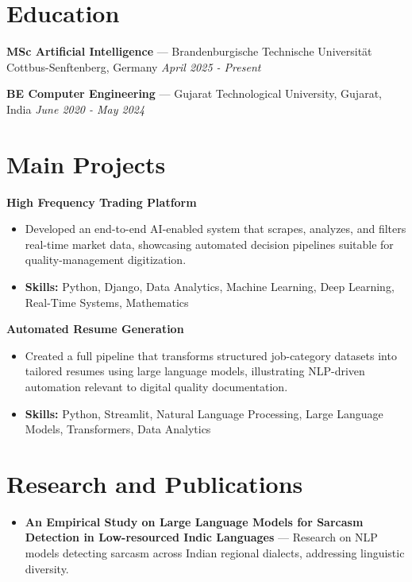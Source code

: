 \documentclass[a4paper,10pt]{article}
\begin{document}
\section*{Education}
\textbf{MSc Artificial Intelligence} — Brandenburgische Technische Universität Cottbus-Senftenberg, Germany \hfill \textit{April 2025 - Present}\par
\vspace{1.5pt}
\textbf{BE Computer Engineering} — Gujarat Technological University, Gujarat, India \hfill \textit{June 2020 - May 2024}\par

\section*{Main Projects}
\textbf{High Frequency Trading Platform}\par
\vspace{1pt}
\begin{itemize}
  \item Developed an end-to-end AI-enabled system that scrapes, analyzes, and filters real-time market data, showcasing automated decision pipelines suitable for quality-management digitization.
  \item \textbf{Skills:} Python, Django, Data Analytics, Machine Learning, Deep Learning, Real-Time Systems, Mathematics
\end{itemize}
\vspace{3pt}
\textbf{Automated Resume Generation}\par
\vspace{1pt}
\begin{itemize}
  \item Created a full pipeline that transforms structured job-category datasets into tailored resumes using large language models, illustrating NLP-driven automation relevant to digital quality documentation.
  \item \textbf{Skills:} Python, Streamlit, Natural Language Processing, Large Language Models, Transformers, Data Analytics
\end{itemize}

\section*{Research and Publications}
\begin{itemize}
\item \textbf{An Empirical Study on Large Language Models for Sarcasm Detection in Low-resourced Indic Languages} — Research on NLP models detecting sarcasm across Indian regional dialects, addressing linguistic diversity.
\end{itemize}
\end{document}

